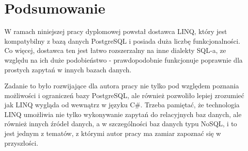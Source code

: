\chapter{Podsumowanie}
W ramach niniejszej pracy dyplomowej powstał dostawca LINQ, który jest kompatybilny z bazą danych PostgreSQL i posiada duża liczbę funkcjonalności. Co więcej, dostawca ten jest łatwo rozszerzalny na inne dialekty SQL-a, ze względu na ich duże podobieństwo - prawdopodobnie funkcjonuje poprawnie dla prostych zapytań w innych bazach danych.

Zadanie to było rozwijające dla autora pracy nie tylko pod względem poznania możliwości i ograniczeń bazy PostgreSQL, ale również pozwoliło lepiej zrozumieć jak LINQ wygląda od wewnątrz w języku C\#. Trzeba pamiętać, że technologia LINQ umożliwia nie tylko wykonywanie zapytań do relacyjnych baz danych, ale również innych źródeł danych, a w szczególności baz danych typu NoSQL, i to jest jednym z tematów, z którymi autor pracy ma zamiar zapoznać się w przyszłości.